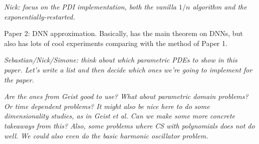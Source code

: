 \documentclass[11pt]{article}
\begin{document}
\textit{Nick: focus on the PDI implementation, both the vanilla $1/n$ algorithm and the exponentially-restarted.}

Paper 2: DNN approximation. Basically, has the main theorem on DNNs, but also has lots of cool experiments comparing with the method of Paper 1.

\textit{Sebastian/Nick/Simone: think about which parametric PDEs to show in this paper. Let's write a list and then decide which ones we're going to implement for the paper.}

\textit{Are the ones from Geist good to use? What about parametric domain problems? Or time dependent problems? It might also be nice here to do some dimensionality studies, as in Geist et al. Can we make some more concrete takeaways from this? Also, some problems where CS with polynomials does not do well. We could also even do the basic harmonic oscillator problem.}
\end{document}
